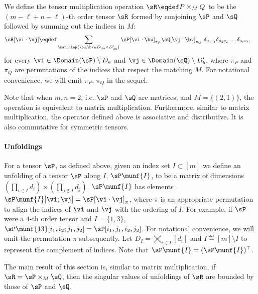 \begin{definition}
  We define the tensor multiplication operation $\sR \eqdef P \times_{M}
  Q$ to be the $(m - \ell + n - \ell)$-th order tensor $\sR$ formed by
  conjoining $\sP$ and $\sQ$ followed by summing out the indices in $M$:
\begin{align*}
  \sR[\vi\cdot\vj] &\eqdef \sum_{\mathclap{\bu, \bv \in D_\ba \times D'_\bb}} \sP[\vi \cdot \bu]_{\pi_P} \sQ[\vj \cdot \bv]_{\pi_Q} ~ \delta_{u_1 v_1} \delta_{u_2 v_2} \ldots \delta_{u_\ell v_\ell},
\end{align*}
  for every $\vi \in \Domain(\sP) \setminus D_a$ and $\vj \in
  \Domain(\sQ) \setminus D'_b$, where $\pi_P$ and $\pi_Q$ are
  permutations of the indices that respect the matching $M$. For
  notational convenience, we will omit $\pi_P$, $\pi_Q$ in the sequel.
\end{definition}

Note that when $m, n = 2$, i.e. $\sP$ and $\sQ$ are matrices, and $M
  = \{(2,1)\}$, the operation is equivalent to matrix multiplication. 
Furthermore, similar to matrix multiplication, the operator defined above
  is associative and distributive. 
It is also commutative for symmetric tensors.

\paragraph{Unfoldings}
For a tensor $\sP$, as defined above, 
  given an index set $I \subset [m]$ we
  define an unfolding of a tensor $\sP$ along $I$,
 $\sP\munf{I}$, to be a matrix of dimensions $(\prod_{i \in I} d_i)
 \times (\prod_{j \not\in I} d_j)$. $\sP\munf{I}$ has elements
 $\sP\munf{I}[\vi;\vj] = \sP[\vi\cdot\vj]_{\pi}$, where $\pi$ is an
 appropriate permutation to align the indices of $\vi$ and $\vj$ with
 the ordering of $I$. 
For example, if $\sP$ were a $4$-th order tensor and $I = \{1,3\}$,
  $\sP\munf{13}[i_1,i_2; j_1,j_2] = \sP[i_1,j_1,i_2,j_2]$.
For notational convenience, we will omit the permutation $\pi$ subsequently.
Let $D_I = \bigtimes_{i \in I} [d_i]$ and  $\bar I \eqdef [m] \setminus
  I$ to represent the complement of indices. Note that $\sP\munf{I}
  = (\sP\munf{\bar I})^\top$.

The main result of this section is, similar to matrix multiplication, if
$\sR = \sP \times_{M} \sQ$, then the singular values of unfoldings
of $\sR$ are bounded by those of $\sP$ and $\sQ$.

